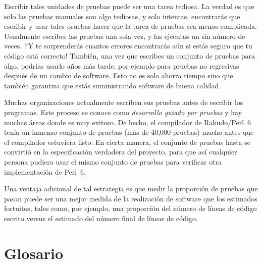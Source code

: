 Escribir tales unidades de pruebas puede ser una tarea 
tediosa. La verdad es que solo las pruebas manuales son
algo tediosas, y solo intentas, encontrarás que escribir
y usar tales pruebas hacer que la tarea de pruebas sea menos
complicada. Usualmente escribes las pruebas una sola vez,
y las ejecutas un sin número de veces. !`Y te sorprenderás 
cuantos errores encontrarás aún si estás seguro que tu código
está correcto! También, una vez que escribes un conjunto de 
pruebas para algo, podrías usarlo años más tarde, por ejemplo 
para pruebas no regresivas después de un cambio de software.
Esto no es solo ahorra tiempo sino que también garantiza que
estás suministrando software de buena calidad.

Muchas organizaciones actualmente escriben sus pruebas antes
de escribir los programas. Este proceso se conoce como 
\emph{desarrollo guiado por pruebas} y hay muchas áreas donde
es muy exitoso. De hecho, el compilador de Rakudo/Perl~6 
tenía un inmenso conjunto de pruebas (más de 40,000 pruebas) 
mucho antes que el compilador estuviera listo. En cierta manera,
el conjunto de pruebas hasta se convirtió en la especificación
verdadera del proyecto, para que así cualquier persona pudiera usar el mismo 
conjunto de pruebas para verificar otra implementación de Perl~6.

Una ventaja adicional de tal estrategia es que medir la proporción
de pruebas que pasan puede ser una mejor medida de la realización de software
que los estimados fortuitos, tales como, por ejemplo, una proporción
del número de líneas de código escrito versus el estimado del
número final de líneas de código.

\section{Glosario}

